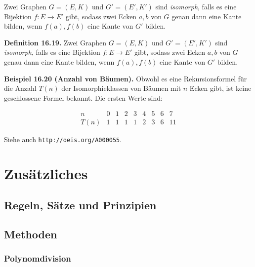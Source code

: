\documentclass[9pt]{article}
\begin{document}
Zwei Graphen \( G = (E, K) \) und \( G' = (E', K') \) sind \textit{isomorph}, falls es eine Bijektion \( f: E \to E' \) gibt, sodass zwei Ecken \( a, b \) von \( G \) genau dann eine Kante bilden, wenn \( f(a), f(b) \) eine Kante von \( G' \) bilden.

\textbf{Definition 16.19.}  
Zwei Graphen \( G = (E, K) \) und \( G' = (E', K') \) sind \textit{isomorph}, falls es eine Bijektion \( f : E \to E' \) gibt, sodass zwei Ecken \( a, b \) von \( G \) genau dann eine Kante bilden, wenn \( f(a), f(b) \) eine Kante von \( G' \) bilden.

\textbf{Beispiel 16.20 (Anzahl von Bäumen).}  
Obwohl es eine Rekursionsformel für die Anzahl \( T(n) \) der Isomorphieklassen von Bäumen mit \( n \) Ecken gibt, ist keine geschlossene Formel bekannt. Die ersten Werte sind:

\[
\begin{array}{c|cccccccc}
n & 0 & 1 & 2 & 3 & 4 & 5 & 6 & 7 \\
\hline
T(n) & 1 & 1 & 1 & 1 & 2 & 3 & 6 & 11
\end{array}
\]

Siehe auch \texttt{http://oeis.org/A000055}.


\chapter{Zusätzliches}

\section{Regeln, Sätze und Prinzipien}

\section{Methoden}\label{sec:Methoden}
\subsection*{Polynomdivision} \label{Polynomdivision}

\printglossary
\printglossary[type=dinge]
\printindex
\end{document}
